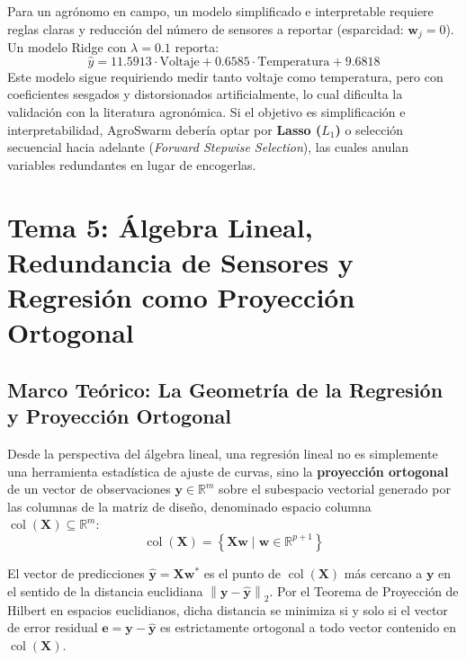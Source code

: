 \documentclass[12pt,a4paper]{article}
\newcommand{\R}{\mathbb{R}}
\newcommand{\norm}[1]{\left\lVert #1\right\rVert}
\newcommand{\col}{\operatorname{col}}
\begin{document}
Para un agrónomo en campo, un modelo simplificado e interpretable requiere reglas claras y reducción del número de sensores a reportar (esparcidad: $\mathbf{w}_j = 0$). Un modelo Ridge con $\lambda = 0.1$ reporta:
\begin{equation}
  \hat{y} = 11.5913 \cdot \text{Voltaje} + 0.6585 \cdot \text{Temperatura} + 9.6818
\end{equation}
Este modelo sigue requiriendo medir tanto voltaje como temperatura, pero con coeficientes sesgados y distorsionados artificialmente, lo cual dificulta la validación con la literatura agronómica. Si el objetivo es simplificación e interpretabilidad, AgroSwarm debería optar por \textbf{Lasso ($L_1$)} o selección secuencial hacia adelante (\textit{Forward Stepwise Selection}), las cuales anulan variables redundantes en lugar de encogerlas.

\newpage
\section{Tema 5: Álgebra Lineal, Redundancia de Sensores y Regresión como Proyección Ortogonal}

\subsection{Marco Teórico: La Geometría de la Regresión y Proyección Ortogonal}

Desde la perspectiva del álgebra lineal, una regresión lineal no es simplemente una herramienta estadística de ajuste de curvas, sino la \textbf{proyección ortogonal} de un vector de observaciones $\mathbf{y} \in \R^m$ sobre el subespacio vectorial generado por las columnas de la matriz de diseño, denominado espacio columna $\col(\mathbf{X}) \subseteq \R^m$:
\begin{equation}
  \col(\mathbf{X}) = \left\{ \mathbf{X}\mathbf{w} \mid \mathbf{w} \in \R^{p+1} \right\}
\end{equation}

El vector de predicciones $\hat{\mathbf{y}} = \mathbf{X}\mathbf{w}^*$ es el punto de $\col(\mathbf{X})$ más cercano a $\mathbf{y}$ en el sentido de la distancia euclidiana $\norm{\mathbf{y} - \hat{\mathbf{y}}}_2$. Por el Teorema de Proyección de Hilbert en espacios euclidianos, dicha distancia se minimiza si y solo si el vector de error residual $\mathbf{e} = \mathbf{y} - \hat{\mathbf{y}}$ es estrictamente ortogonal a todo vector contenido en $\col(\mathbf{X})$.
\end{document}
